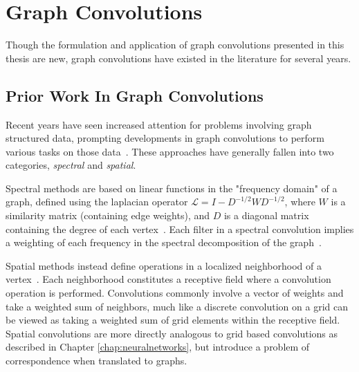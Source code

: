 \section{Graph Convolutions}
Though the formulation and application of graph convolutions presented in this thesis are new, graph convolutions have existed in the literature for several years.


\subsection{Prior Work In Graph Convolutions}
Recent years have seen increased attention for problems involving graph structured data, prompting developments in graph convolutions to perform various tasks on those data~\cite{bronstein2016}.
These approaches have generally fallen into two categories, \textit{spectral} and \textit{spatial}.

Spectral methods are based on linear functions in the "frequency domain" of a graph, defined using the laplacian operator $\mathcal{L}=I-D^{-1/2}WD^{-1/2}$, where $W$ is a similarity matrix (containing edge weights), and $D$ is a diagonal matrix containing the degree of each vertex~\cite{bruna2013}\cite{henaff2015}\cite{kipf2016}.
Each filter in a spectral convolution implies a weighting of each frequency in the spectral decomposition of the graph~\cite{mallat2009}.

Spatial methods instead define operations in a localized neighborhood of a vertex~\cite{henaff2015}\cite{atwood2016diffusion}.
Each neighborhood constitutes a receptive field where a convolution operation is performed. 
Convolutions commonly involve a vector of weights and take a weighted sum of neighbors, much like a discrete convolution on a grid can be viewed as taking a weighted sum of grid elements within the receptive field.
Spatial convolutions are more directly analogous to grid based convolutions as described in Chapter \ref{chap:neuralnetworks}, but introduce a problem of correspondence when translated to graphs.

